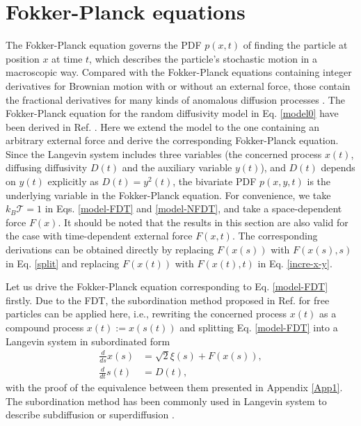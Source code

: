 \documentclass[aps,pre,twocolumn,groupedaddress,longbibliography]{revtex4-2}
\begin{document}
\section{Fokker-Planck equations}\label{Sec3}
The Fokker-Planck equation governs the PDF $p(x,t)$ of finding the particle at position $x$ at time $t$, which describes the particle's stochastic motion in a macroscopic way. Compared with the Fokker-Planck equations containing integer derivatives for Brownian motion with or without an external force, those contain the fractional derivatives for many kinds of anomalous diffusion processes \cite{MetzlerKlafter:00,FriedrichJenkoBauleEule:2006,TurgemanCarmiBarkai:2009,KosztolowiczDutkiewicz:2021}. The Fokker-Planck equation for the random diffusivity model in Eq. \eqref{model0} have been derived in Ref. \cite{ChechkinSenoMetzlerSokolov:2017}.
Here we extend the model to the one containing an arbitrary external force and derive the corresponding Fokker-Planck equation.
Since the Langevin system includes three variables (the concerned process $x(t)$, diffusing diffusivity $D(t)$ and the auxiliary variable $y(t)$), and $D(t)$ depends on $y(t)$ explicitly as $D(t)=y^2(t)$, the bivariate PDF $p(x,y,t)$ is the underlying variable in the Fokker-Planck equation.
For convenience, we take $k_B\mathcal{T}=1$ in Eqs. \eqref{model-FDT} and \eqref{model-NFDT}, and take a space-dependent force $F(x)$. It should be noted that the results in this section are also valid for the case with time-dependent external force $F(x,t)$. The corresponding derivations can be obtained directly by replacing $F(x(s))$ with $F(x(s),s)$ in Eq. \eqref{split} and replacing $F(x(t))$ with $F(x(t),t)$ in Eq. \eqref{incre-x-y}.


Let us drive the Fokker-Planck equation corresponding to Eq. \eqref{model-FDT} firstly. Due to the FDT, the subordination method proposed in Ref. \cite{ChechkinSenoMetzlerSokolov:2017} for free particles can be applied here, i.e., rewriting the concerned process $x(t)$ as a compound process $x(t):=x(s(t))$ and splitting Eq. \eqref{model-FDT} into a Langevin system in subordinated form
\begin{equation}\label{split}
\begin{split}
\frac{d}{d s}x(s)&=\sqrt{2}\xi(s)+F(x(s)),\\
\frac{d}{d t}s(t)&=D(t),
\end{split}
\end{equation}
with the proof of the equivalence between them presented in Appendix \ref{App1}. The subordination method has been commonly used in Langevin system to describe subdiffusion \cite{Fogedby:1994,MetzlerKlafter:2000-2} or superdiffusion \cite{FriedrichJenkoBauleEule:2006,EuleZaburdaevFriedrichGeisel:2012,WangChenDeng:2019}.
\end{document}
